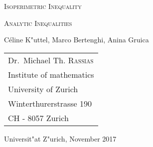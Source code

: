 \documentclass[12pt,a4paper]{report}
\begin{document}
\begin{titlepage}
	\centering
	{\scshape\LARGE Isoperimetric Inequality   \par}
	\vspace{1cm}
	{\scshape\Large Analytic Inequalities \par}
	\vspace{1.5cm}
	{\Large C\'eline K"uttel, Marco Bertenghi, Anina Gruica \par}
	\vfill

\begin{tabular}{l}
    	 Dr.~Michael Th. \textsc{Rassias} \\
	Institute of mathematics\\
	University of Zurich \\
	 Winterthurerstrasse 190\\
	 CH - 8057 Zurich \\
     \end{tabular}	


	\vfill
	{Universit"at Z"urich, November 2017}
\end{titlepage}
\end{document}
